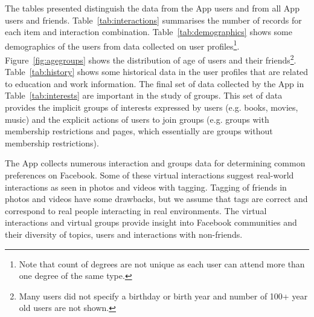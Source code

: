 The tables presented distinguish the data from the App users and from
all App users and friends. Table~\ref{tab:interactions}
summarises the number of records for each item and interaction
combination. Table~\ref{tab:demographics} shows some demographics of
the users from data collected on user profiles\footnote{Note that
count of degrees are not unique as each user can attend more than one
degree of the same type.}. Figure~\ref{fig:agegroups} shows the distribution of age of
users and their friends\footnote{Many users did not specify a birthday or birth year and number of 100+ year old users are not shown.}. Table~\ref{tab:history} shows some historical
data in the user profiles that are related to education and work information. The final
set of data collected by the App in Table~\ref{tab:interests} are
important in the study of groups. This set of data provides the
implicit groups of interests expressed by users (e.g. books, movies,
music) and the explicit actions of users to join groups (e.g. groups
with membership restrictions and pages, which essentially are groups
without membership restrictions).

The App collects numerous interaction and groups data for determining common preferences on Facebook. Some of these virtual interactions suggest real-world interactions as seen in photos and videos with tagging. Tagging of friends in photos and videos have some drawbacks, but we assume that tags are correct and correspond to real people interacting in real environments. The virtual interactions and virtual groups provide insight into Facebook communities and their diversity of topics, users and interactions with non-friends.


